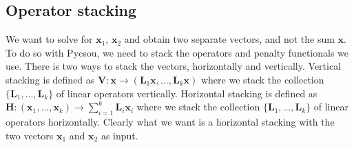 \documentclass[a4paper,11pt,oneside]{report}
\theoremstyle{named}
\begin{document}
\subsection{Operator stacking}
We want to solve for $\boldsymbol{x}_1$, $\boldsymbol{x}_2$ and obtain two separate vectors, and not the sum $\boldsymbol{x}$. To do so with Pycsou, we need to stack the operators and penalty functionals we use. There is two ways to stack the vectors, horizontally and vertically. Vertical stacking is defined as $\boldsymbol{V}: \boldsymbol{x} \xrightarrow{} ( \boldsymbol{L}_1 \boldsymbol{x}, \dots, \boldsymbol{L}_k \boldsymbol{x} ) $ where we stack the collection $\{\boldsymbol{L}_1,\dots, \boldsymbol{L}_k\}$ of linear operators vertically. Horizontal stacking is defined as  $\boldsymbol{H}: (\boldsymbol{x}_1,\dots,\boldsymbol{x}_k) \xrightarrow{} \sum_{i = 1}^{k} \boldsymbol{L}_i \boldsymbol{x}_i$ where we stack the collection $\{\boldsymbol{L}_1,\dots, \boldsymbol{L}_k\}$ of linear operators horizontally. Clearly what we want is a horizontal stacking with the two vectors $\boldsymbol{x}_1$ and $\boldsymbol{x}_2$ as input.
\end{document}

